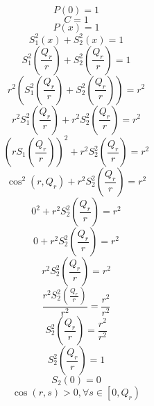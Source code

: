 \documentclass[a4paper,12pt]{report}
\begin{document}
\begin{equation}
P(0) = 1
\end{equation}
\begin{equation}
C = 1
\end{equation}
\begin{equation}
P(x) = 1
\end{equation}
\begin{equation}
S_1^2(x) + S_2^2(x) = 1
\end{equation}
\begin{equation}
S_1^2{\left(\frac{Q_r}{r}\right)} + S_2^2{\left(\frac{Q_r}{r}\right)} = 1
\end{equation}
\begin{equation}
r^2 \left(S_1^2{\left(\frac{Q_r}{r}\right)} + S_2^2{\left(\frac{Q_r}{r}\right)}\right) = r^2
\end{equation}
\begin{equation}
r^2 S_1^2{\left(\frac{Q_r}{r}\right)} + r^2 S_2^2{\left(\frac{Q_r}{r}\right)} = r^2
\end{equation}
\begin{equation}
\left(r S_1{\left(\frac{Q_r}{r}\right)}\right)^2 + r^2 S_2^2{\left(\frac{Q_r}{r}\right)} = r^2
\end{equation}
\begin{equation}
\cos^2(r,Q_r) + r^2 S_2^2{\left(\frac{Q_r}{r}\right)} = r^2
\end{equation}
\begin{equation}
0^2 + r^2 S_2^2{\left(\frac{Q_r}{r}\right)} = r^2
\end{equation}
\begin{equation}
0 + r^2 S_2^2{\left(\frac{Q_r}{r}\right)} = r^2
\end{equation}
\begin{equation}
r^2 S_2^2{\left(\frac{Q_r}{r}\right)} = r^2
\end{equation}
\begin{equation}
\frac{r^2 S_2^2{\left(\frac{Q_r}{r}\right)}}{r^2} = \frac{r^2}{r^2}
\end{equation}
\begin{equation}
S_2^2{\left(\frac{Q_r}{r}\right)} = \frac{r^2}{r^2}
\end{equation}
\begin{equation}
S_2^2{\left(\frac{Q_r}{r}\right)} = 1
\end{equation}
\begin{equation}
S_2(0) = 0
\end{equation}
\begin{equation}
\cos(r,s) > 0, \forall s \in \left[0, Q_r\right)
\end{equation}
\end{document}
